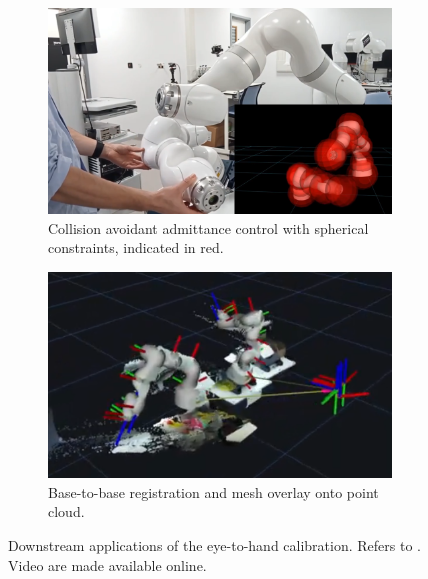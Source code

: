 \begin{figure}[tbh]
    \centering
    \begin{subfigure}[b]{0.49\textwidth}
        \centering
        \includegraphics[width=\textwidth]{chapter_1/img/admittance_avoidance.png}
        \caption{Collision avoidant admittance control with spherical constraints, indicated in red.}
        \label{c1:fig:admittance}
    \end{subfigure}
    \begin{subfigure}[b]{0.49\textwidth}
        \centering
        \includegraphics[width=\textwidth]{chapter_1/img/base_to_base_reg.png}
        \caption{Base-to-base registration and mesh overlay onto point cloud.}
        \label{c1:fig:base_to_base}
    \end{subfigure}
    \caption{Downstream applications of the eye-to-hand calibration. Refers to . Video are made available online\protect\footnotemark.}
    \label{c1:fig:downstream}
\end{figure}

